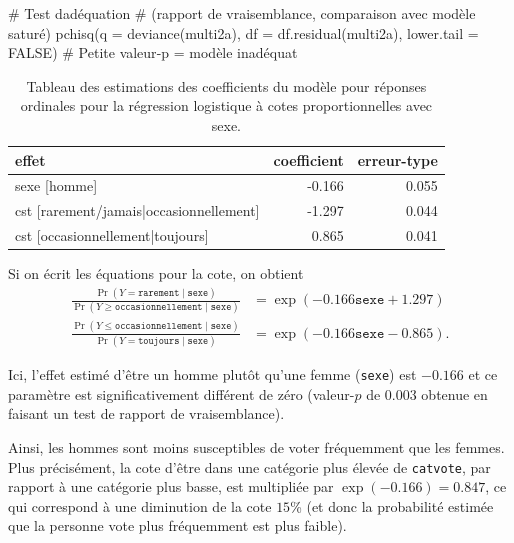 \documentclass[
  11pt,
  letterpaper,
]{scrbook}
\newenvironment{Shaded}{\begin{snugshade}}{\end{snugshade}}
\newcommand{\AttributeTok}[1]{\textcolor[rgb]{0.40,0.45,0.13}{#1}}
\newcommand{\CommentTok}[1]{\textcolor[rgb]{0.37,0.37,0.37}{#1}}
\newcommand{\ConstantTok}[1]{\textcolor[rgb]{0.56,0.35,0.01}{#1}}
\newcommand{\FunctionTok}[1]{\textcolor[rgb]{0.28,0.35,0.67}{#1}}
\newcommand{\NormalTok}[1]{\textcolor[rgb]{0.00,0.23,0.31}{#1}}
\theoremstyle{definition}
\theoremstyle{remark}
\begin{document}
\begin{Shaded}
\begin{Highlighting}[]
\CommentTok{\# Test d\textquotesingle{}adéquation }
\CommentTok{\# (rapport de vraisemblance, comparaison avec modèle saturé)}
\FunctionTok{pchisq}\NormalTok{(}\AttributeTok{q =} \FunctionTok{deviance}\NormalTok{(multi2a),}
       \AttributeTok{df =} \FunctionTok{df.residual}\NormalTok{(multi2a),}
       \AttributeTok{lower.tail =} \ConstantTok{FALSE}\NormalTok{)}
\CommentTok{\# Petite valeur{-}p = modèle inadéquat}
\end{Highlighting}
\end{Shaded}

\hypertarget{tbl-ordered-logistic}{}
\begin{table}
\caption{\label{tbl-ordered-logistic}Tableau des estimations des coefficients du modèle pour réponses
ordinales pour la régression logistique à cotes proportionnelles avec
sexe. }\tabularnewline

\centering
\begin{tabular}[t]{lrr}
\toprule
effet & coefficient & erreur-type\\
\midrule
sexe [homme] & -0.166 & 0.055\\
cst [rarement/jamais|occasionnellement] & -1.297 & 0.044\\
cst [occasionnellement|toujours] & 0.865 & 0.041\\
\bottomrule
\end{tabular}
\end{table}

Si on écrit les équations pour la cote, on obtient \begin{align*}
\frac{\Pr(Y = \texttt{rarement} \mid \texttt{sexe})}{\Pr(Y \geq \texttt{occasionnellement} \mid \texttt{sexe})} &= \exp(-0.166\texttt{sexe} + 1.297) \\ 
\frac{\Pr(Y \leq \texttt{occasionnellement} \mid \texttt{sexe})}{\Pr(Y = \texttt{toujours} \mid \texttt{sexe})} &= \exp(-0.166\texttt{sexe} - 0.865).
\end{align*}

Ici, l'effet estimé d'être un homme plutôt qu'une femme (\texttt{sexe})
est \(-0.166\) et ce paramètre est significativement différent de zéro
(valeur-\(p\) de \(0.003\) obtenue en faisant un test de rapport de
vraisemblance).

Ainsi, les hommes sont moins susceptibles de voter fréquemment que les
femmes. Plus précisément, la cote d'être dans une catégorie plus élevée
de \texttt{catvote}, par rapport à une catégorie plus basse, est
multipliée par \(\exp(-0.166) = 0.847\), ce qui correspond à une
diminution de la cote \(15\)\% (et donc la probabilité estimée que la
personne vote plus fréquemment est plus faible).
\end{document}

